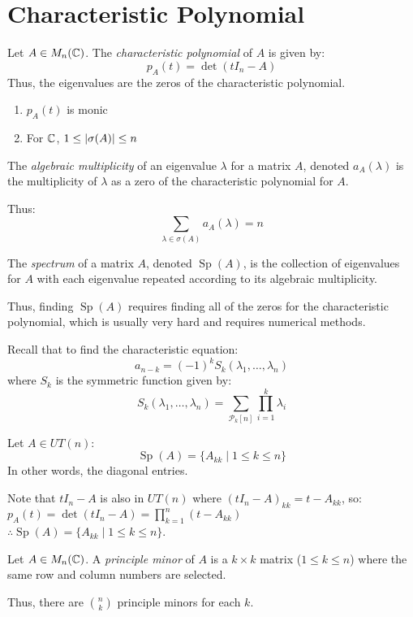 \documentclass[letterpaper,12pt,fleqn]{article}
\renewcommand{\l}{\lambda}
\renewcommand{\o}{\sigma}
\DeclareMathOperator{\Sp}{Sp}
\begin{document}
\section*{Characteristic Polynomial}

\begin{definition}
  Let $A\in M_n(\mathbb{C})$. The \emph{characteristic polynomial} of $A$ is given by:
  \[p_A(t)=\det(t I_n-A)\]
  Thus, the eigenvalues are the zeros of the characteristic polynomial.
\end{definition}

\begin{properties}
  \listbreak
  \begin{enumerate}
  \item $p_A(t)$ is monic
  \item For $\mathbb{C}$, $1\le\abs{\o(A)}\le n$
  \end{enumerate}
\end{properties}

\begin{definition}
  The \emph{algebraic multiplicity} of an eigenvalue $\l$ for a matrix $A$,
  denoted $a_A(\l)$ is the multiplicity of $\l$ as a zero of the characteristic
  polynomial for $A$.

  Thus:
  \[\sum_{\l\in\o(A)}a_A(\l)=n\]
\end{definition}

\begin{definition}[Spectrum]
  The \emph{spectrum} of a matrix $A$, denoted $\Sp(A)$, is the collection of eigenvalues
  for $A$ with each eigenvalue repeated according to its algebraic multiplicity.
\end{definition}

Thus, finding $\Sp(A)$ requires finding all of the zeros for the characteristic
polynomial, which is usually very hard and requires numerical methods.

Recall that to find the characteristic equation:
\[a_{n-k}=(-1)^kS_k(\l_1,\ldots,\l_n)\]
where $S_k$ is the symmetric function given by:
\[S_k(\l_1,\ldots,\l_n)=\sum_{\mathcal{P}_k[n]}\prod_{i=1}^k\lambda_i\]

\begin{theorem}
  Let $A\in UT(n)$:
  \[\Sp(A)=\{A_{kk}\mid 1\le k\le n\}\]
  In other words, the diagonal entries.
\end{theorem}

\begin{theproof}
  Note that $tI_n-A$ is also in $UT(n)$ where $(tI_n-A)_{kk}=t-A_{kk}$, so: \\
  $p_A(t)=\det(tI_n-A)=\prod_{k=1}^n(t-A_{kk})$ \\
  $\therefore \Sp(A)=\{A_{kk}\mid 1\le k\le n\}$.
\end{theproof}

\begin{definition}
  Let $A\in M_n(\mathbb{C})$. A \emph{principle minor} of $A$ is a $k\times k$ matrix
  ($1\le k\le n$) where the same row and column numbers are selected.

  Thus, there are $\binom{n}{k}$ principle minors for each $k$.
\end{definition}
\end{document}
